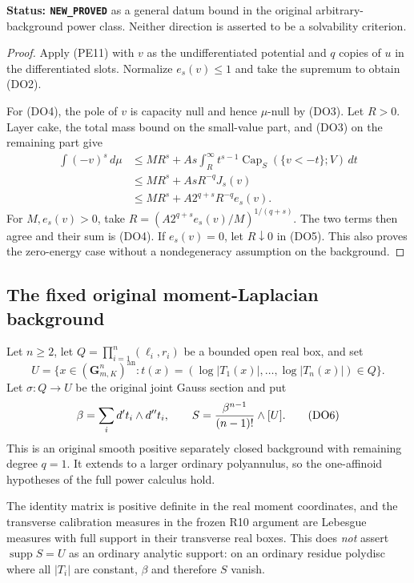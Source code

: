 \documentclass[11pt,a4paper]{article}
\numberwithin{equation}{section}
\theoremstyle{definition}
\theoremstyle{remark}
\begin{document}
\noindent\textbf{Status: \texttt{NEW\_PROVED}} as a general
datum bound in the original arbitrary-background power class.
Neither direction is asserted to be a solvability criterion.

\begin{proof}
Apply (PE11) with $v$ as the undifferentiated potential and
$q$ copies of $u$ in the differentiated slots. Normalize
$e_s(v)\leq1$ and take the supremum to obtain (DO2).

For (DO4), the pole of $v$ is capacity null and hence $\mu$-null
by (DO3). Let $R>0$. Layer cake, the total mass bound on the
small-value part, and (DO3) on the remaining part give
\[
 \begin{split}
 \int(-v)^s\,d\mu
 &\leq M R^s+A s\int_R^\infty
                        t^{s-1}\operatorname{Cap}_S(\{v<-t\};V)\,dt\\
 &\leq M R^s+A s R^{-q}J_s(v)\\
 &\leq M R^s+A2^{q+s}R^{-q}e_s(v).
 \end{split}
 \tag{DO5}
\]
For $M,e_s(v)>0$, take
$R=(A2^{q+s}e_s(v)/M)^{1/(q+s)}$.
The two terms then agree and their sum is (DO4).
If $e_s(v)=0$, let $R\downarrow0$ in (DO5).
This also proves the zero-energy case without a nondegeneracy
assumption on the background.
\end{proof}

\subsection{The fixed original moment-Laplacian background}

Let $n\geq2$, let $Q=\prod_{i=1}^n(\ell_i,r_i)$ be a bounded
open real box, and set
\[
 U=\{x\in(\mathbf G_{m,K}^n)^{\mathrm{an}}:
                         t(x)=(\log|T_1(x)|,\ldots,\log|T_n(x)|)\in Q\}.
\]
Let $\sigma:Q\to U$ be the original joint Gauss section and put
\[
 \beta=\sum_i d't_i\wedge d''t_i,\qquad
                 S={\beta^{n-1}\over(n-1)!}\wedge[U].
 \tag{DO6}
\]
This is an original smooth positive separately closed background
with remaining degree $q=1$. It extends to a larger ordinary
polyannulus, so the one-affinoid hypotheses of the full power
calculus hold.

The identity matrix is positive definite in the real moment
coordinates, and the transverse calibration measures in the
frozen R10 argument are Lebesgue measures with full support in
their transverse real boxes. This does \emph{not} assert
$\operatorname{supp}S=U$ as an ordinary analytic support:
on an ordinary residue polydisc where all $|T_i|$ are constant,
$\beta$ and therefore $S$ vanish.
\end{document}
